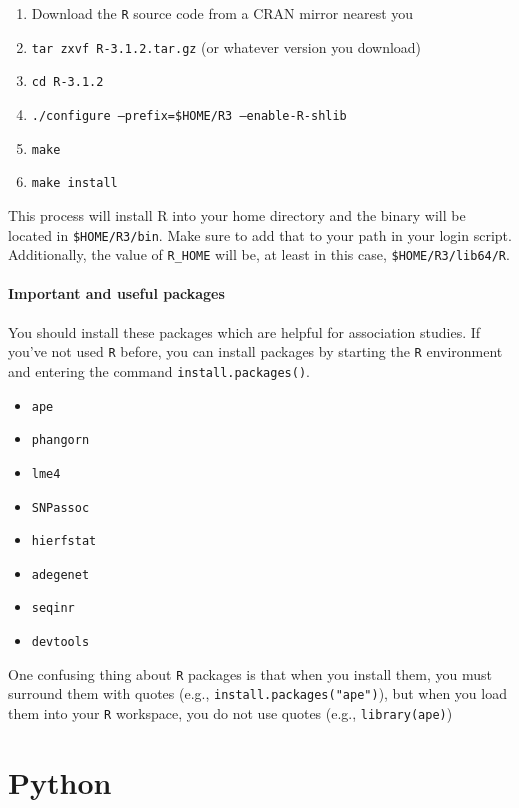 \documentclass{article}
\begin{document}
\begin{enumerate}
\item{Download the \texttt{R} source code from a CRAN mirror nearest you}
\item{\texttt{tar zxvf R-3.1.2.tar.gz} (or whatever version you download)}
\item{\texttt{cd R-3.1.2}}
\item{\texttt{./configure --prefix=\$HOME/R3 --enable-R-shlib}}
\item{\texttt{make}}
\item{\texttt{make install}}
\end{enumerate}

This process will install R into your home directory and the binary will be
located in \texttt{\$HOME/R3/bin}.  Make sure to add that to your path in your login
script. Additionally, the value of \texttt{R\_HOME} will be, at least in this
case, \texttt{\$HOME/R3/lib64/R}.

\paragraph{Important and useful packages} You should install these packages
which are helpful for association studies.  If you've not used \texttt{R}
before, you can install packages by starting the \texttt{R} environment and
entering the command \texttt{install.packages()}.

\begin{itemize}
\item{\texttt{ape}}
\item{\texttt{phangorn}}
\item{\texttt{lme4}}
\item{\texttt{SNPassoc}}
\item{\texttt{hierfstat}}
\item{\texttt{adegenet}}
\item{\texttt{seqinr}}
\item{\texttt{devtools}}
\end{itemize}

One confusing thing about \texttt{R} packages is that when you install them, you
must surround them with quotes (e.g., \texttt{install.packages("ape")}), but
when you load them into your \texttt{R} workspace, you do not use quotes (e.g.,
\texttt{library(ape)})

\section*{Python}
\end{document}
